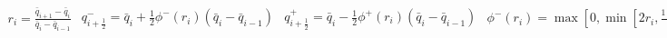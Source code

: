 \documentclass[SingleSpace,12pt]{Serre_ASCE}
\begin{document}
%
\begin{linenomath*}
\begin{subequations}\label{eq:recon2}
\begin{gather}\label{eq:recon2r}
r_i = \frac{\bar{q}_{i+1} - \bar{q}_{i} }{\bar{q}_{i} - \bar{q}_{i-1}}
\end{gather}
\begin{gather}\label{eq:recon21}
q^-_{i + \frac{1}{2}} = \bar{q}_i + \frac{1}{2}\phi^-\left(r_i\right)\left(\bar{q}_i -\bar{q}_{i-1} \right)
\end{gather}
\begin{gather}\label{eq:recon22}
q^+_{i + \frac{1}{2}} = \bar{q}_i - \frac{1}{2}\phi^+\left(r_i\right)\left(\bar{q}_i -\bar{q}_{i-1} \right)
\end{gather}
\begin{gather}\label{eq:recon2p1}
\phi^-\left(r_i\right) = \max\left[0, \min\left[2 r_i, \frac{1 + 2r_i}{3},2\right]\right]
\end{gather}
\begin{gather}\label{eq:recon2p2}
\phi^+\left(r_i\right) = \max\left[0, \min\left[2 r_i, \frac{2 + r_i}{3},2\right]\right]
\end{gather}
\end{subequations}
\end{linenomath*}
\end{document}
